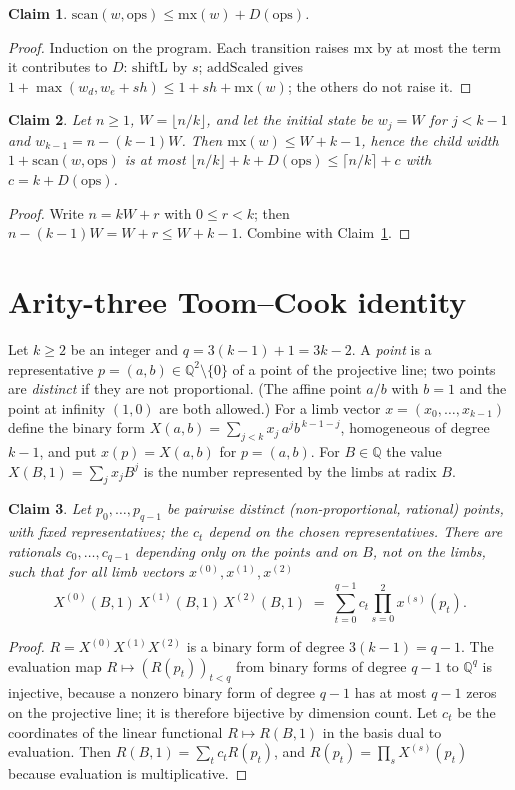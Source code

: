 \documentclass{article}
\newtheorem{claim}{Claim}
\begin{document}
\begin{claim}\label{c:scan}
$\mathrm{scan}(w,\text{ops})\le \mathrm{mx}(w)+D(\text{ops})$.
\end{claim}
\begin{proof} Induction on the program. Each transition raises $\mathrm{mx}$ by at most the term it contributes to $D$:
$\mathrm{shiftL}$ by $s$; $\mathrm{addScaled}$ gives $1+\max(w_d,w_e+sh)\le 1+sh+\mathrm{mx}(w)$; the others do not raise it.\end{proof}

\begin{claim}\label{c:child}
Let $n\ge 1$, $W=\lfloor n/k\rfloor$, and let the initial state be $w_j=W$ for $j<k-1$ and $w_{k-1}=n-(k-1)W$.
Then $\mathrm{mx}(w)\le W+k-1$, hence the child width $1+\mathrm{scan}(w,\text{ops})$ is at most $\lfloor n/k\rfloor+k+D(\text{ops})\le\lceil n/k\rceil+c$ with $c=k+D(\text{ops})$.
\end{claim}
\begin{proof} Write $n=kW+r$ with $0\le r<k$; then $n-(k-1)W=W+r\le W+k-1$. Combine with Claim~\ref{c:scan}.\end{proof}

\section{Arity-three Toom--Cook identity}
Let $k\ge2$ be an integer and $q=3(k-1)+1=3k-2$. A \emph{point} is a representative $p=(a,b)\in\mathbb Q^2\setminus\{0\}$ of a point of the projective
line; two points are \emph{distinct} if they are not proportional. (The affine point $a/b$ with $b=1$ and the point at infinity
$(1,0)$ are both allowed.) For a limb vector $x=(x_0,\dots,x_{k-1})$ define the binary form
$X(a,b)=\sum_{j<k}x_j\,a^j b^{\,k-1-j}$, homogeneous of degree $k-1$, and put $x(p)=X(a,b)$ for $p=(a,b)$.
For $B\in\mathbb Q$ the value $X(B,1)=\sum_j x_jB^j$ is the number represented by the limbs at radix $B$.

\begin{claim}\label{c:node}
Let $p_0,\dots,p_{q-1}$ be pairwise distinct (non-proportional, rational) points, with fixed representatives; the $c_t$ depend on the chosen representatives. There are rationals $c_0,\dots,c_{q-1}$ depending only on the points and
on $B$, not on the limbs, such that for all limb vectors $x^{(0)},x^{(1)},x^{(2)}$
\[
X^{(0)}(B,1)\,X^{(1)}(B,1)\,X^{(2)}(B,1)\;=\;\sum_{t=0}^{q-1} c_t\prod_{s=0}^{2}x^{(s)}(p_t).
\]
\end{claim}
\begin{proof} $R=X^{(0)}X^{(1)}X^{(2)}$ is a binary form of degree $3(k-1)=q-1$. The evaluation map
$R\mapsto (R(p_t))_{t<q}$ from binary forms of degree $q-1$ to $\mathbb Q^q$ is injective, because a nonzero binary form of
degree $q-1$ has at most $q-1$ zeros on the projective line; it is therefore bijective by dimension count. Let $c_t$ be the
coordinates of the linear functional $R\mapsto R(B,1)$ in the basis dual to evaluation. Then $R(B,1)=\sum_tc_tR(p_t)$, and
$R(p_t)=\prod_sX^{(s)}(p_t)$ because evaluation is multiplicative.\end{proof}
\end{document}

